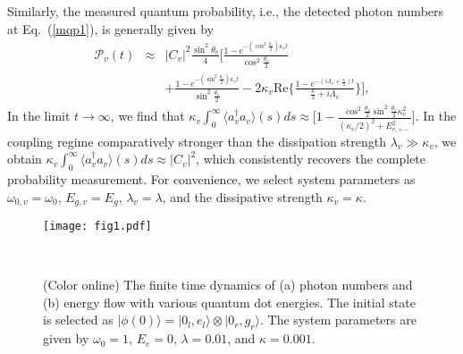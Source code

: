 \documentclass[twocolumn,showpacs,preprintnumbers,amsmath,amssymb]{revtex4}
\begin{document}
	Similarly, the measured quantum probability, i.e., the detected photon numbers at Eq.~(\ref{mqp1}), is generally given by
		\begin{eqnarray}
			\mathscr{P}_v(t) & \approx&
			|C_v|^2\frac{\sin^2\theta_v}{4}
			\Big[\frac{1-e^{-(\cos^2\frac{\theta_v}{2})\kappa_vt}}{\cos^2\frac{\theta_v}{2}}\nonumber\\
			&&+\frac{1-e^{-(\sin^2\frac{\theta_v}{2})\kappa_vt}}{\sin^2\frac{\theta_v}{2}} - 2\kappa_v\textrm{Re}\Big\{\frac{1- e^{-(i\Lambda_v+\frac{\kappa}{2})t}}{\frac{\kappa}{2}+i\Lambda_v}\Big\}\Big],\nonumber
		\end{eqnarray}
	In the limit $t{\rightarrow}\infty$, we find that
	$\kappa_v\int^\infty_0\langle a^\dagger_v a_v\rangle(s)ds \approx
	\Big[1
	-\frac{\cos^2\frac{\theta_v}{2}\sin^2\frac{\theta_v}{2}\kappa^2_v}{(\kappa_v/2)^2+E^2_{v,+-}}\Big]$.
	In the coupling regime comparatively stronger than the dissipation strength $\lambda_v{\gg}\kappa_v$,
	we obtain $\kappa_v\int^\infty_0\langle a^\dagger_v a_v\rangle(s)ds \approx |C_v|^2$,
	which consistently recovers the complete probability measurement.
	For convenience, we select system parameters as
	$\omega_{0,v}=\omega_0$,
	$E_{g,v}=E_g$,
	$\lambda_v=\lambda$,
	and the dissipative strength $\kappa_v=\kappa$.
	


	\begin{figure}[tbp]
		\begin{center}
			\texttt{[image: fig1.pdf]}
			\caption{(Color online) The finite time dynamics of (a) photon numbers and (b) energy flow with various quantum dot energies. The initial state is selected as $|\phi(0){\rangle}=|0_l,e_{l}{\rangle}{\otimes}|0_r,g_{r}{\rangle}$. The system parameters are given by $\omega_0=1$,
				$E_{e}=0$,
				$\lambda=0.01$,
				and $\kappa=0.001$.
			}~\label{fig1}
		\end{center}
	\end{figure}
\end{document}
